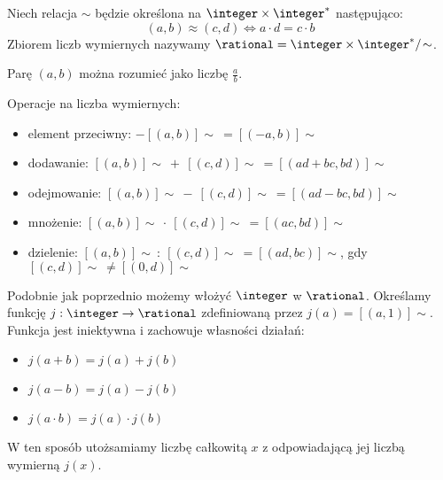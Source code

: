 \begin{definition}
    Niech relacja \( \sim \) będzie określona na \( \integer \times \integer^{*} \) następująco:
    \[
        (a, b) \approx (c, d) \iff a \cdot d = c \cdot b
    \]
    Zbiorem liczb wymiernych nazywamy \( \rational = \integer \times \integer^{*} /\!\sim \).
\end{definition}
Parę \( (a, b) \) można rozumieć jako liczbę \( \frac{a}{b} \).

Operacje na liczba wymiernych:
\begin{itemize}
    \item element przeciwny: \( -[(a, b)]\!\sim \: = [(-a, b)]\!\sim \)
    \item dodawanie: \( [(a, b)]\!\sim \: + \: [(c, d)]\!\sim \: = [(ad + bc, bd)]\!\sim \)
    \item odejmowanie: \( [(a, b)]\!\sim \: - \: [(c, d)]\!\sim \: = [(ad - bc, bd)]\!\sim \)
    \item mnożenie: \( [(a, b)]\!\sim \: \cdot \: [(c, d)]\!\sim \: = [(ac, bd)]\!\sim \)
    \item dzielenie: \( [(a, b)]\!\sim \: : \: [(c, d)]\!\sim \: = [(ad, bc)]\!\sim \), gdy \( [(c, d)]\!\sim \:\ne [(0, d)]\!\sim \)
\end{itemize}


Podobnie jak poprzednio możemy włożyć \( \integer \) w \( \rational \). Określamy funkcję \( j : \integer \rightarrow \rational \) zdefiniowaną przez \( j(a) = [(a, 1)]\!\sim \).
Funkcja jest iniektywna i zachowuje własności działań:
\begin{itemize}
    \item \( j(a + b) = j(a) + j(b) \)
    \item \( j(a - b) = j(a) - j(b) \)
    \item \( j(a \cdot b) = j(a) \cdot j(b) \)
\end{itemize}
W ten sposób utożsamiamy liczbę całkowitą \( x \) z odpowiadającą jej liczbą wymierną \( j(x) \).